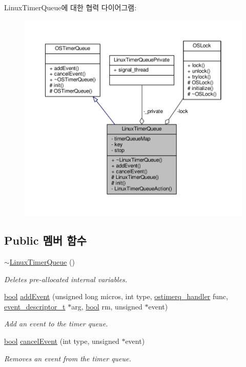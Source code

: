 Linux\+Timer\+Queue에 대한 협력 다이어그램\+:
\nopagebreak
\begin{figure}[H]
\begin{center}
\leavevmode
\includegraphics[width=350pt]{class_linux_timer_queue__coll__graph}
\end{center}
\end{figure}
\subsection*{Public 멤버 함수}
\begin{DoxyCompactItemize}
\item 
\hyperlink{class_linux_timer_queue_abecd74c46859b7dc05bc6c04e87282f4}{$\sim$\+Linux\+Timer\+Queue} ()
\begin{DoxyCompactList}\small\item\em Deletes pre-\/allocated internal variables. \end{DoxyCompactList}\item 
\hyperlink{avb__gptp_8h_af6a258d8f3ee5206d682d799316314b1}{bool} \hyperlink{class_linux_timer_queue_af91c63e95e1888dc178cbd09764ae2af}{add\+Event} (unsigned long micros, int type, \hyperlink{avbts__ostimerq_8hpp_ac7e0bdbe70d3e2951c02906cf4ed3aed}{ostimerq\+\_\+handler} func, \hyperlink{structevent__descriptor__t}{event\+\_\+descriptor\+\_\+t} $\ast$arg, \hyperlink{avb__gptp_8h_af6a258d8f3ee5206d682d799316314b1}{bool} rm, unsigned $\ast$event)
\begin{DoxyCompactList}\small\item\em Add an event to the timer queue. \end{DoxyCompactList}\item 
\hyperlink{avb__gptp_8h_af6a258d8f3ee5206d682d799316314b1}{bool} \hyperlink{class_linux_timer_queue_a85d2e5f092c3854728747bdb9177291d}{cancel\+Event} (int type, unsigned $\ast$event)
\begin{DoxyCompactList}\small\item\em Removes an event from the timer queue. \end{DoxyCompactList}\end{DoxyCompactItemize}
